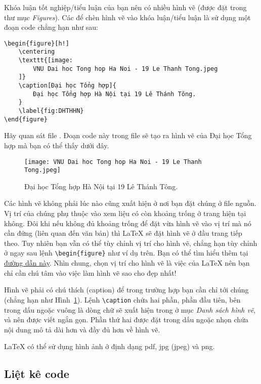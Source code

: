 Khóa luận tốt nghiệp/tiểu luận của bạn nên có nhiều hình vẽ (được đặt trong thư mục \emph{Figures}). Các để chèn hình vẽ vào khóa luận/tiểu luận là sử dụng một đoạn code chẳng hạn như sau:
\begin{Verbatim}
\begin{figure}[h!]
	\centering
	\texttt{[image: 
		VNU Dai hoc Tong hop Ha Noi - 19 Le Thanh Tong.jpeg
	]}
	\caption[Đại học Tổng hợp]{
		Đại học Tổng hợp Hà Nội tại 19 Lê Thánh Tông.
	}
	\label{fig:DHTHHN}
\end{figure}
\end{Verbatim}

Hãy quan sát file . Đoạn code này trong file  sẽ tạo ra hình vẽ của Đại học Tổng hợp mà bạn có thể thấy dưới đây.
\begin{figure}[h!]
	\centering
	\texttt{[image: VNU Dai hoc Tong hop Ha Noi - 19 Le Thanh Tong.jpeg]}
	\caption[Đại học Tổng hợp]{Đại học Tổng hợp Hà Nội tại 19 Lê Thánh Tông.}
	\label{fig:DHTHHN}
\end{figure}

Các hình vẽ không phải lúc nào cũng xuất hiện ở nơi bạn đặt chúng ở file nguồn. Vị trí của chúng phụ thuộc vào xem liệu có còn khoảng trống ở trang hiện tại không. Đôi khi nếu không đủ khoảng trống để đặt vừa hình vẽ vào vị trí mà nó cần đứng (liên quan đến văn bản) thì \LaTeX{} sẽ đặt hình vẽ ở đầu trang tiếp theo. Tuy nhiên bạn vẫn có thể tùy chỉnh vị trí cho hình vẽ, chẳng hạn tùy chỉnh \option{[h!]} ở ngay sau lệnh \verb|\begin{figure}| như ví dụ trên. Bạn có thể tìm hiểu thêm tại \href{https://www.overleaf.com/learn/latex/Positioning_images_and_tables}{đường dẫn này}. Nhìn chung, chọn vị trí cho hình vẽ là việc của \LaTeX{} nên bạn chỉ cần chú tâm vào việc làm hình vẽ sao cho đẹp nhất!

Hình vẽ phải có chú thích (caption) để trong trường hợp bạn cần chỉ tới chúng (chẳng hạn như Hình~\ref{fig:DHTHHN}). Lệnh \verb|\caption| chứa hai phần, phần đầu tiên, bên trong dấu ngoặc vuông là dòng chữ sẽ xuất hiện trong ở mục \emph{Danh sách hình vẽ}, và nên được viết ngắn gọn. Phần thứ hai được đặt trong dấu ngoặc nhọn chứa nội dung mô tả dài hơn và đầy đủ hơn về hình vẽ.

\LaTeX{} có thể sử dụng hình ảnh ở định dạng pdf, jpg (jpeg) và png.


\subsection{Liệt kê code}

